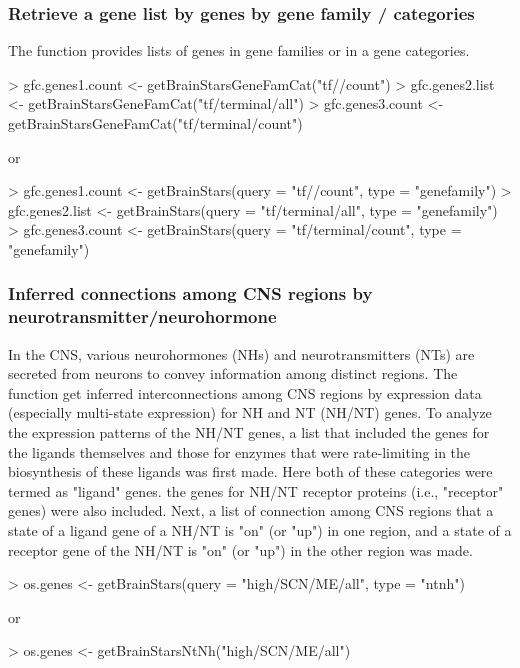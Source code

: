 \documentclass[12pt,fullpage]{article}
\begin{document}
\subsubsection{Retrieve a gene list by genes by gene family / categories}
The function provides lists of genes in gene families or in a gene categories. 
\begin{Schunk}
\begin{Sinput}
> gfc.genes1.count <- getBrainStarsGeneFamCat("tf//count")
> gfc.genes2.list  <- getBrainStarsGeneFamCat("tf/terminal/all")
> gfc.genes3.count <- getBrainStarsGeneFamCat("tf/terminal/count")
\end{Sinput}
\end{Schunk}
or
\begin{Schunk}
\begin{Sinput}
> gfc.genes1.count <- getBrainStars(query = "tf//count",         type = "genefamily")
> gfc.genes2.list  <- getBrainStars(query = "tf/terminal/all",   type = "genefamily")
> gfc.genes3.count <- getBrainStars(query = "tf/terminal/count", type = "genefamily")
\end{Sinput}
\end{Schunk}

\subsubsection{Inferred connections among CNS regions by neurotransmitter/neurohormone}
In the CNS, various neurohormones (NHs) and neurotransmitters (NTs) are secreted from neurons to convey information among distinct regions. The function get inferred interconnections among CNS regions by expression data (especially multi-state expression) for NH and NT (NH/NT) genes. To analyze the expression patterns of the NH/NT genes, a list that included the genes for the ligands themselves and those for enzymes that were rate-limiting in the biosynthesis of these ligands was first made. Here both of these categories were termed as "ligand" genes. the genes for NH/NT receptor proteins (i.e., "receptor" genes) were also included. Next, a list of connection among CNS regions that a state of a ligand gene of a NH/NT is "on" (or "up") in one region, and a state of a receptor gene of the NH/NT is "on" (or "up") in the other region was made.
\begin{Schunk}
\begin{Sinput}
> os.genes <- getBrainStars(query = "high/SCN/ME/all", type = "ntnh")
\end{Sinput}
\end{Schunk}
or
\begin{Schunk}
\begin{Sinput}
> os.genes <- getBrainStarsNtNh("high/SCN/ME/all")
\end{Sinput}
\end{Schunk}
\end{document}
